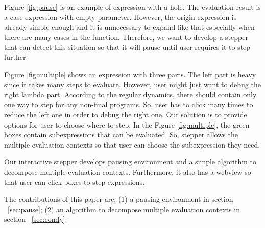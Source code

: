 
Figure \ref{fig:pause} is an example of expression with a hole. The evaluation result is a case expression with empty parameter. However, the origin expression is already simple enough and it is unnecessary to expand like that especially when there are many cases in the function. Therefore, we want to develop a stepper that can detect this situation so that it will pause until user requires it to step further.

Figure \ref{fig:multiple} shows an expression with three parts. The left part is heavy since it takes many steps to evaluate. However, user might just want to debug the right lambda part. According to the regular dynamics, there should contain only one way to step for any non-final programs. So, user has to click many times to reduce the left one in order to debug the right one. Our solution is to provide options for user to choose where to step. In the Figure \ref{fig:multiple}, the green boxes contain subexpressions that can be evaluated. So, stepper allows the multiple evaluation contexts so that user can choose the subexpression they need.

Our interactive stepper develops pausing environment and a simple algorithm to decompose multiple evaluation contexts. Furthermore, it also has a webview so that user can click boxes to step expressions.

 The contributions of this paper are: (1) a pausing environment in section ~\ref{sec:pause}; (2) an algorithm to decompose multiple evaluation contexts in section ~\ref{sec:condy}.